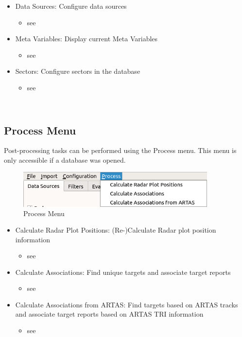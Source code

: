 \begin{itemize}
 \item Data Sources: Configure data sources
  \begin{itemize}
 \item see 
 \end{itemize}
 \item Meta Variables: Display current Meta Variables
  \begin{itemize}
 \item see 
 \end{itemize}
 \item Sectors: Configure sectors in the database
  \begin{itemize}
 \item see 
 \end{itemize}
\end{itemize}
\  \\

\subsection{Process Menu}
\label{sec:ui_overview_process_menu}

Post-processing tasks can be performed using the Process menu. This menu is only accessible if a database was opened.

\begin{figure}[H]
  \center
    \includegraphics[width=10cm,frame]{figures/ui_process_menu.png}
  \caption{Process Menu}
\end{figure}

\begin{itemize}
 \item Calculate Radar Plot Positions: (Re-)Calculate Radar plot position information
   \begin{itemize}
 \item see 
 \end{itemize}
 \item Calculate Associations: Find unique targets and associate target reports
   \begin{itemize}
 \item see 
 \end{itemize}
 \item Calculate Associations from ARTAS: Find targets based on ARTAS tracks and associate target reports based on ARTAS TRI information
   \begin{itemize}
 \item see 
 \end{itemize}
\end{itemize}
\  \\

